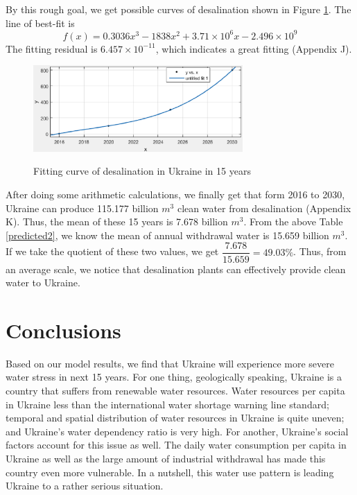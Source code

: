 By this rough goal, we get possible curves of desalination shown in Figure \ref{fitting}. The line of best-fit is
\begin{equation}
f(x)=0.3036x^3 -1838x^2 + 3.71\times10^6x -2.496\times10^9
\end{equation}
The fitting residual is $6.457\times10^{-11}$, which indicates a great fitting (Appendix J).
\begin{figure}[!htbp]
  \centering
  \includegraphics[width=8cm]{./picture/fitting.eps}\\
  \caption{Fitting curve of desalination in Ukraine in 15 years}\label{fitting}
\end{figure}

After doing some arithmetic calculations, we finally get that form 2016 to 2030, Ukraine can produce 115.177 billion $m^3$ clean water from desalination (Appendix K). Thus, the mean of these 15 years is 7.678 billion $m^3$. From the above Table \ref{predicted2}, we know the mean of annual withdrawal water is 15.659 billion $m^3$. If we take the quotient of these two values, we get $\dfrac{7.678}{15.659}=49.03\%$. Thus, from an average scale, we notice that desalination plants can effectively provide clean water to Ukraine.


\section{Conclusions}
Based on our model results, we find that Ukraine will experience more severe water stress in next 15 years. For one thing, geologically speaking, Ukraine is a country that suffers from renewable water resources. Water resources per capita in Ukraine less than the international water shortage warning line standard; temporal and spatial distribution of water resources in Ukraine is quite uneven; and Ukraine's water dependency ratio is very high. For another, Ukraine's social factors account for this issue as well. The daily water consumption per capita in Ukraine as well as the large amount of industrial withdrawal has made this country even more vulnerable. In a nutshell, this water use pattern is leading Ukraine to a rather serious situation.

